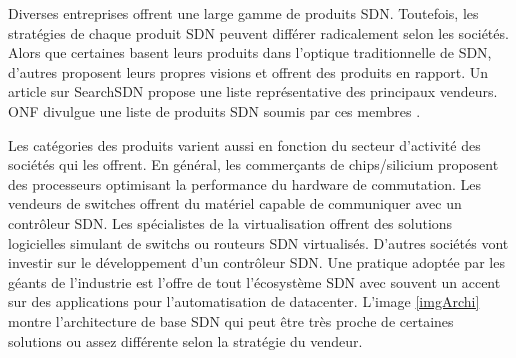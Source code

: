 

Diverses entreprises offrent une large gamme de produits SDN. Toutefois, les stratégies de chaque produit SDN peuvent différer radicalement selon les sociétés. Alors que certaines basent leurs produits dans l'optique traditionnelle de SDN, d'autres proposent leurs propres visions et offrent des produits en rapport. Un article sur SearchSDN \cite{42Vendors} propose une liste représentative des principaux vendeurs. ONF divulgue une liste de produits SDN soumis par ces membres \cite{ProductDirectory}.  

Les catégories des produits varient aussi en fonction du secteur d'activité des sociétés qui les offrent. En général, les commerçants de chips/silicium proposent des processeurs optimisant la performance du hardware de commutation.  Les vendeurs de switches offrent du matériel capable de communiquer avec un contrôleur SDN. Les spécialistes de la \gls{virtualisation} offrent des solutions logicielles simulant de switchs ou routeurs SDN virtualisés. D'autres sociétés vont investir sur le développement d'un contrôleur SDN. Une pratique adoptée par les géants de l'industrie est l'offre de tout l'écosystème SDN avec souvent un accent sur des applications pour l'automatisation de \gls{datacenter}.\cite{2013GuideSDNNVEcosystem} L'image \ref{imgArchi} montre l'architecture de base SDN qui peut être très proche de certaines solutions ou assez différente selon la stratégie du vendeur.
 
